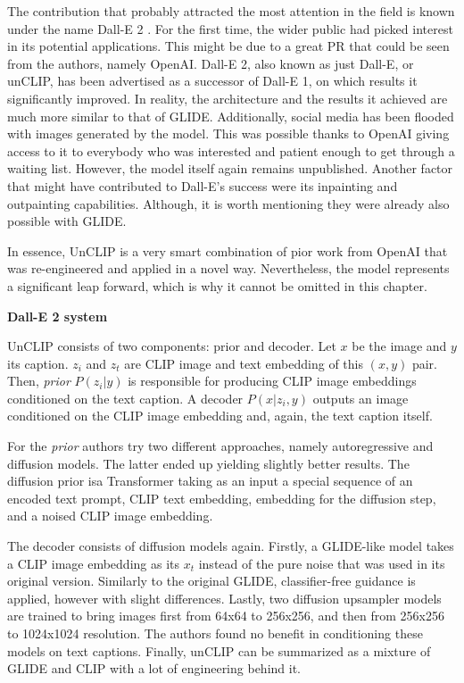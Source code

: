 \documentclass[
]{krantz}
\begin{document}
The contribution that probably attracted the most attention in the field is known under the name Dall-E 2 \citep{DALLE2}. For the first time, the wider public had picked interest in its potential applications. This might be due to a great PR that could be seen from the authors, namely OpenAI. Dall-E 2, also known as just Dall-E, or unCLIP, has been advertised as a successor of Dall-E 1, on which results it significantly improved. In reality, the architecture and the results it achieved are much more similar to that of GLIDE. Additionally, social media has been flooded with images generated by the model. This was possible thanks to OpenAI giving access to it to everybody who was interested and patient enough to get through a waiting list. However, the model itself again remains unpublished. Another factor that might have contributed to Dall-E's success were its inpainting and outpainting capabilities. Although, it is worth mentioning they were already also possible with GLIDE.

In essence, UnCLIP is a very smart combination of pior work from OpenAI that was re-engineered and applied in a novel way. Nevertheless, the model represents a significant leap forward, which is why it cannot be omitted in this chapter.

\textbf{Dall-E 2 system}

UnCLIP consists of two components: prior and decoder. Let \(x\) be the image and \(y\) its caption. \(z_{i}\) and \(z_{t}\) are CLIP image and text embedding of this \((x, y)\) pair. Then, \emph{prior} \(P(z_{i}|y)\) is responsible for producing CLIP image embeddings conditioned on the text caption. A decoder \(P(x|z_{i},y)\) outputs an image conditioned on the CLIP image embedding and, again, the text caption itself.

For the \emph{prior} authors try two different approaches, namely autoregressive and diffusion models. The latter ended up yielding slightly better results. The diffusion prior isa Transformer taking as an input a special sequence of an encoded text prompt, CLIP text embedding, embedding for the diffusion step, and a noised CLIP image embedding.

The decoder consists of diffusion models again. Firstly, a GLIDE-like model takes a CLIP image embedding as its \(x_{t}\) instead of the pure noise that was used in its original version. Similarly to the original GLIDE, classifier-free guidance is applied, however with slight differences. Lastly, two diffusion upsampler models are trained to bring images first from 64x64 to 256x256, and then from 256x256 to 1024x1024 resolution. The authors found no benefit in conditioning these models on text captions. Finally, unCLIP can be summarized as a mixture of GLIDE and CLIP with a lot of engineering behind it.
\end{document}
